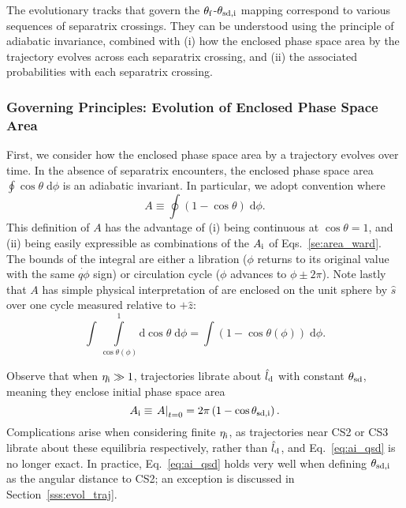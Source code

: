\documentclass[
        fleqn,
        usenatbib,
        referee,
    ]{mnras}
\newcommand*{\at}[1]{\left.#1\right|}
\newcommand*{\p}[1]{\left(#1\right)}
\begin{document}
The evolutionary tracks that govern the $\theta_{\rm f}$-$\theta_{\rm sd, i}$
mapping correspond to various sequences of separatrix crossings. They can be
understood using the principle of adiabatic invariance, combined with (i) how
the enclosed phase space area by the trajectory evolves across each separatrix
crossing, and (ii) the associated probabilities with each separatrix crossing.

\subsubsection{Governing Principles: Evolution of Enclosed Phase Space
Area}\label{sss:a_evo}

First, we consider how the enclosed phase space area by a trajectory evolves
over time. In the absence of separatrix encounters, the enclosed phase space
area $\oint \cos\theta \;\mathrm{d}\phi$ is an adiabatic invariant. In
particular, we adopt convention where
\begin{equation}
    A \equiv \oint \p{1 - \cos \theta}\;\mathrm{d}\phi.\label{eq:a_oint}
\end{equation}
This definition of $A$ has the advantage of (i) being continuous at $\cos \theta
= 1$, and (ii) being easily expressible as combinations of the $A_{\rm i}$ of
Eqs.~\eqref{se:area_ward}. The bounds of the integral are either a libration
($\phi$ returns to its original value with the same $\dot{q\phi}$ sign) or
circulation cycle ($\phi$ advances to $\phi \pm 2\pi$). Note lastly that $A$ has
simple physical interpretation of are enclosed on the unit sphere by $\hat{s}$
over one cycle measured relative to $+\hat{z}$:
\begin{equation}
    \int \int\limits_{\cos \theta(\phi)}^1
        \mathrm{d}\cos\theta\;\mathrm{d}\phi = \int \p{1 - \cos \theta(\phi)}
            \;\mathrm{d}\phi.
\end{equation}

Observe that when $\eta_{\rm i} \gg 1$, trajectories librate about $\hat{l}_{\rm d}$
with constant $\theta_{\rm sd}$, meaning they enclose initial phase space area
\begin{equation}
    A_{\rm i} \equiv \at{A}_{t = 0}
        = 2\pi\p{1 - \cos \theta_{\rm sd, i}}.\label{eq:ai_qsd}
\end{equation}
Complications arise when considering finite $\eta_{\rm i}$, as trajectories near CS2
or CS3 librate about these equilibria respectively, rather than $\hat{l}_{\rm
d}$, and Eq.~\eqref{eq:ai_qsd} is no longer exact. In practice,
Eq.~\eqref{eq:ai_qsd} holds very well when defining $\theta_{\rm sd, i}$ as the
angular distance to CS2; an exception is discussed in Section~\ref{sss:evol_traj}.
\end{document}
